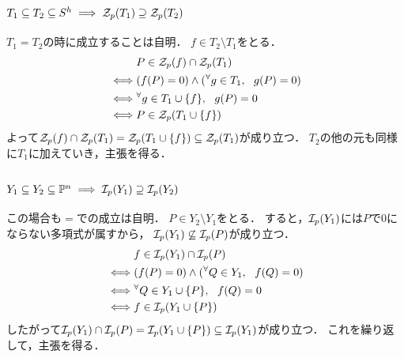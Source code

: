 \documentclass[a4paper]{jarticle}
\begin{document}
    \subsection{$T_1 \subseteq T_2 \subseteq S^h \implies \mathcal{Z}_p(T_1) \supseteq \mathcal{Z}_p(T_2)$}
    $T_1=T_2$の時に成立することは自明．
    $f \in T_2 \setminus T_1$をとる．
    \begin{align*}
        {}&     P \in \mathcal{Z}_p(f) \cap \mathcal{Z}_p(T_1) \\
        \iff&   (f(P)=0) \land ({}^{\forall} g \in T_1,~~ g(P)=0) \\
        \iff&   {}^{\forall} g \in T_1 \cup \{f\},~~ g(P)=0 \\
        \iff&   P \in \mathcal{Z}_p(T_1 \cup \{f\})
    \end{align*}
    よって$\mathcal{Z}_p(f) \cap \mathcal{Z}_p(T_1)=\mathcal{Z}_p(T_1 \cup \{f\}) \subseteq \mathcal{Z}_p(T_1)$が成り立つ．
    $T_2$の他の元も同様に$T_1$に加えていき，主張を得る．

    \subsection{$Y_1 \subseteq Y_2 \subseteq \mathbb{P}^n \implies \mathcal{I}_p(Y_1) \supseteq \mathcal{I}_p(Y_2)$}
    この場合も$=$での成立は自明．
    $P \in Y_2 \setminus Y_1$をとる．
    すると，$\mathcal{I}_p(Y_1)$には$P$で0にならない多項式が属すから，
    $\mathcal{I}_p(Y_1) \not \subseteq \mathcal{I}_p(P)$が成り立つ．
    \begin{align*}
        {}&     f \in \mathcal{I}_p(Y_1) \cap \mathcal{I}_p(P) \\
        \iff&   (f(P)=0) \land ({}^{\forall} Q \in Y_1,~~ f(Q)=0) \\
        \iff&   {}^{\forall} Q \in Y_1 \cup \{P\},~~ f(Q)=0 \\
        \iff&   f \in \mathcal{I}_p(Y_1 \cup \{P\})
    \end{align*}
    したがって$\mathcal{I}_p(Y_1) \cap \mathcal{I}_p(P) = \mathcal{I}_p(Y_1 \cup \{P\}) \subseteq \mathcal{I}_p(Y_1)$が成り立つ．
    これを繰り返して，主張を得る．
\end{document}
